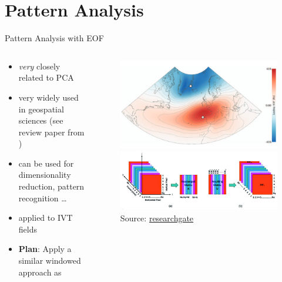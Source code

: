 \section{Pattern Analysis}

\begin{frame}{Pattern Analysis with EOF}
  \begin{columns}
    \begin{column}{.5\textwidth}
      \begin{itemize}
        \item \textit{very} closely related to PCA 
        \item very widely used in geospatial sciences (see review paper from \citeauthor{hannachi_empirical_2007} \cite{hannachi_empirical_2007})
        \item can be used for dimensionality reduction, pattern recognition \dots
        \item applied to IVT fields \cite{ayantobo_integrated_2022, salstein_modes_1983, jiang_water_2009}
        \item \textbf{Plan}: Apply a similar windowed approach as \citeauthor{vietinghoff_visual_2021}
      \end{itemize} 
      
    \end{column}
    \begin{column}{.5\textwidth}
    \begin{figure}[t]
      \centering
      \includegraphics[width=.7\columnwidth]{imglib/nao_eof_index.png}\\
      \includegraphics[width=.9 \columnwidth]{imglib/eof_matrix_decomp.png}
      {\tiny Source: \href{https://www.researchgate.net/publication/357212141_Latest_Advances_in_Common_Signal_Processing_of_Pulsed_Thermography_for_Enhanced_Detectability_A_Review/figures?lo=1}{researchgate}}
    \end{figure}

    \end{column}
    
  \end{columns}
\end{frame}

